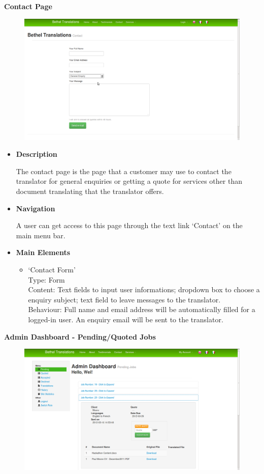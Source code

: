 \documentclass{l3proj}
\begin{document}
\textbf{Contact Page}
\begin{figure}[H]
\centering
\includegraphics[width=0.8\linewidth]{images/contactPage}
\vspace{-30pt}
\end{figure}

\begin{itemize}
\item \textbf{Description}

The contact page is the page that a customer may use to contact the translator for general enquiries or getting a quote for services other than document translating that the translator offers. 

\item \textbf{Navigation}

A user can get access to this page through the text link `Contact' on the main menu bar.

\item \textbf{Main Elements}
\begin{itemize}
\item `Contact Form'\\
Type: Form\\
Content: Text fields to input user informations; dropdown box to choose a enquiry subject; text field to leave messages to the translator. \\
Behaviour: Full name and email address will be automatically filled for a logged-in user. An enquiry email will be sent to the translator. \\

\end{itemize}
\end{itemize}

\textbf{Admin Dashboard - Pending/Quoted Jobs}
\begin{figure}[H]
\centering
\includegraphics[width=0.8\linewidth]{images/adminDashPending}
\vspace{-30pt}
\end{figure}
\end{document}
